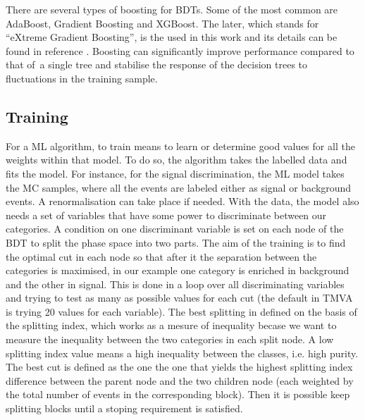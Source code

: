 There are several types of boosting for BDTs. Some of the most common are AdaBoost, Gradient Boosting and XGBoost. 
The later, which stands for ``eXtreme Gradient Boosting'', is the used in this work and its details can be found in reference \cite{Chen_2016}.
Boosting can significantly improve performance compared to that of a single tree and stabilise 
the response of the decision trees to fluctuations in the training sample.




\subsection{Training}
For a ML algorithm, to train means to learn or determine good values for all the weights within that model. 
To do so, the algorithm takes the labelled data and fits the model. For instance, for the signal discrimination,
the ML model takes the MC samples, where all the events are labeled either as signal or background events. 
A renormalisation can take place if needed. 
With the data, the model also needs 
a set of variables that have some power to discriminate between our categories.  A condition on one discriminant variable
is set on each node of the BDT to split the phase space into two parts.
The aim of the training is to find the optimal cut in each node so that after it
the separation between the categories is maximised, in our example one category is enriched in background and the other in signal.  
This is done in a loop over all discriminating variables and trying to test as many as possible values for each cut 
(the default in TMVA is trying 20 values for each variable). The best splitting in defined on the basis of the splitting index,
which works as a mesure of inequality becase we want to measure the inequality between the two categories in each split node. 
A low splitting index value means a high inequality between the classes, i.e. high purity.
The best cut is defined as the one the one that yields the highest splitting index difference between the parent node
and the two children node (each weighted by the total number of events in the corresponding block). 
Then it is possible keep splitting blocks until a stoping requirement is satisfied. 




